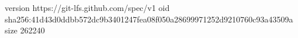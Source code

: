 version https://git-lfs.github.com/spec/v1
oid sha256:41d43d0ddbb572dc9b3401247fea08f050a28699971252d9210760c93a43509a
size 262240
